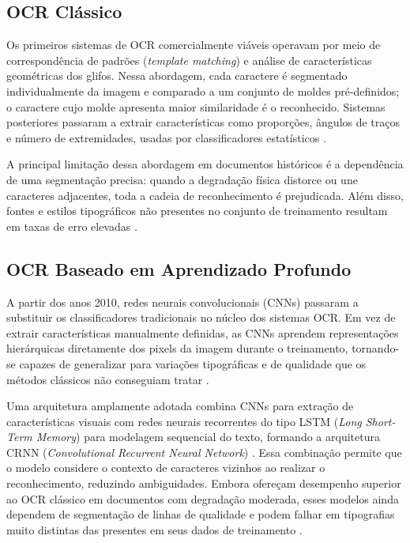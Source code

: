 \documentclass[noabntexcite,oneside]{ufsc-thesis-rn46-2019}
\begin{document}
\subsection{OCR Clássico}

Os primeiros sistemas de OCR comercialmente viáveis operavam por meio de correspondência
de padrões (\textit{template matching}) e análise de características geométricas dos
glifos. Nessa abordagem, cada caractere é segmentado individualmente da imagem e
comparado a um conjunto de moldes pré-definidos; o caractere cujo molde apresenta maior
similaridade é o reconhecido. Sistemas posteriores passaram a extrair características
como proporções, ângulos de traços e número de extremidades, usadas por classificadores
estatísticos \cite{mori1992}.

A principal limitação dessa abordagem em documentos históricos é a dependência de uma
segmentação precisa: quando a degradação física distorce ou une caracteres adjacentes,
toda a cadeia de reconhecimento é prejudicada. Além disso, fontes e estilos tipográficos
não presentes no conjunto de treinamento resultam em taxas de erro elevadas
\cite{lombardi2020}.

\subsection{OCR Baseado em Aprendizado Profundo}

A partir dos anos 2010, redes neurais convolucionais (CNNs) passaram a substituir os
classificadores tradicionais no núcleo dos sistemas OCR. Em vez de extrair características
manualmente definidas, as CNNs aprendem representações hierárquicas diretamente dos
pixels da imagem durante o treinamento, tornando-se capazes de generalizar para variações
tipográficas e de qualidade que os métodos clássicos não conseguiam tratar
\cite{lombardi2020}.

Uma arquitetura amplamente adotada combina CNNs para extração de características visuais
com redes neurais recorrentes do tipo LSTM (\textit{Long Short-Term Memory}) para
modelagem sequencial do texto, formando a arquitetura CRNN (\textit{Convolutional Recurrent Neural
Network}) \cite{shi2017,hochreiter1997}. Essa combinação permite que o modelo considere o contexto de caracteres
vizinhos ao realizar o reconhecimento, reduzindo ambiguidades. Embora ofereçam desempenho
superior ao OCR clássico em documentos com degradação moderada, esses modelos ainda
dependem de segmentação de linhas de qualidade e podem falhar em tipografias muito
distintas das presentes em seus dados de treinamento \cite{lombardi2020}.
\end{document}
